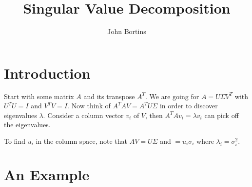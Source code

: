 \documentclass{article}
\title{Singular Value Decomposition}
\author{John Bortins}
\begin{document}
\maketitle{}

\section{Introduction}
Start with some matrix $A$ and its transpose $A^T$. We are going for $A=U\Sigma V^T$ with $U^T U=I$ and $V^T V=I$. Now think of $A^T AV=A^T U\Sigma$ in  order to discover eigenvalues $\lambda$. Consider a column vector $v_i$ of $V$, then $A^T Av_i=\lambda v_i$ can pick off the eigenvalues.

To find $u_i$ in the column space, note that $AV=U\Sigma$ and $=u_i\sigma_i$ where $\lambda_i=\sigma_i^2$.
\section{An Example }
\end{document}
